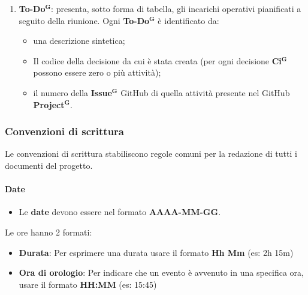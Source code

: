 \documentclass[a4paper,12pt]{article}
\newcommand{\term}[1]{\textbf{#1}$^\mathbf{G}$}
\begin{document}
\begin{enumerate}
\begin{itemize}
    \item \textbf{fase}, indica la fase di progetto a cui si riferisce;
    \item \textbf{Y}, indica il numero del \term{Verbale} in riferimento a quella revisione;
    \item \textbf{X} indica il numero della decisione interna a quel documento.
\end{itemize}
  \item \textbf{\term{To-Do}}: presenta, sotto forma di tabella, gli incarichi operativi pianificati a seguito della riunione. Ogni \textbf{\term{To-Do}} è identificato da:
  \begin{itemize}
      \item una descrizione sintetica;
      \item Il codice della decisione da cui è stata creata (per ogni decisione \term{Ci} possono essere zero o più attività);
      \item il numero della \term{Issue} GitHub di quella attività presente nel GitHub \term{Project}.
  \end{itemize}
\end{enumerate}

\subsubsection*{Convenzioni di scrittura} \label{subsubsec:convenzioni-scrittura}
Le convenzioni di scrittura stabiliscono regole comuni per la redazione di tutti i documenti del progetto.
\paragraph{Date}
\begin{itemize}
    \item Le \textbf{date} devono essere nel formato \textbf{AAAA-MM-GG}. 
\end{itemize}
Le ore hanno 2 formati:
\begin{itemize}
    \item \textbf{Durata}: Per esprimere una durata usare il formato \textbf{Hh Mm} (es: 2h 15m)
    \item \textbf{Ora di orologio}: Per indicare che un evento è avvenuto in una specifica ora, usare il formato \textbf{HH:MM} (es: 15:45)
\end{itemize}
\end{document}
